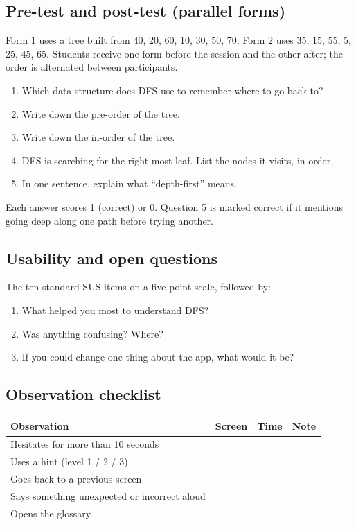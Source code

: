\documentclass[11pt,a4paper]{article}
\begin{document}
\subsection*{Pre-test and post-test (parallel forms)}

Form 1 uses a tree built from 40, 20, 60, 10, 30, 50, 70; Form 2 uses 35, 15, 55, 5, 25, 45, 65.
Students receive one form before the session and the other after; the order is alternated between
participants.

\begin{enumerate}
  \item Which data structure does DFS use to remember where to go back to?
  \item Write down the pre-order of the tree.
  \item Write down the in-order of the tree.
  \item DFS is searching for the right-most leaf. List the nodes it visits, in order.
  \item In one sentence, explain what ``depth-first'' means.
\end{enumerate}

Each answer scores 1 (correct) or 0. Question 5 is marked correct if it mentions going deep along
one path before trying another.

\subsection*{Usability and open questions}

The ten standard SUS items \cite{brooke1996} on a five-point scale, followed by:

\begin{enumerate}
  \item What helped you most to understand DFS?
  \item Was anything confusing? Where?
  \item If you could change one thing about the app, what would it be?
\end{enumerate}

\subsection*{Observation checklist}

\begin{tabularx}{\textwidth}{@{}L c c c@{}}
  \toprule
  \textbf{Observation} & \textbf{Screen} & \textbf{Time} & \textbf{Note} \\
  \midrule
  Hesitates for more than 10 seconds & & & \\
  Uses a hint (level 1 / 2 / 3) & & & \\
  Goes back to a previous screen & & & \\
  Says something unexpected or incorrect aloud & & & \\
  Opens the glossary & & & \\
  \bottomrule
\end{tabularx}
\end{document}
